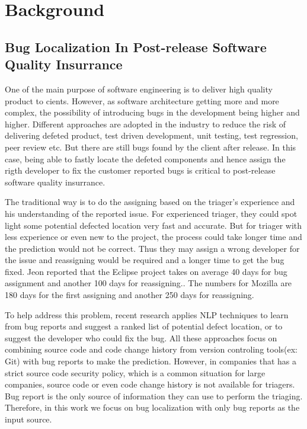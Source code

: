 \section{Background}
\subsection{Bug Localization In Post-release Software Quality Insurrance}
One of the main purpose of software engineering is to deliver high quality product to cients.
However, as software architecture getting more and more complex, the possibility of introducing bugs in the development being higher and higher.  
Different approaches are adopted in the industry to reduce the risk of delivering defeted product, test driven development, unit testing, test regression, peer review etc.
But there are still bugs found by the client after release. 
In this case, being able to fastly locate the defeted components and hence assign the rigth developer to fix the customer reported bugs is critical to post-release software quality insurrance. 

The traditional way is to do the assigning based on the triager's experience and his understanding of the reported issue. 
For experienced triager, they could spot light some potential defected location very fast and accurate.
But for triager with less experience or even new to the project, the process could take longer time and the prediction would not be correct.
Thus they may assign a wrong developer for the issue and reassigning would be required and a longer time to get the bug fixed. 
Jeon \etal \cite{jeong2009improving} reported that the Eclipse project takes on average 40 days for bug assignment and another 100 days for reassigning..
The numbers for Mozilla are 180 days for the first assigning and another 250 days for reassigning.

To help address this problem, recent research applies NLP techniques to learn from bug reports and suggest a ranked list of potential defect location\cite{gay2009use}\cite{lam2017bug}\cite{nguyen2011topic}\cite{zhou2012should}\cite{saha2013improving}\cite{shokripour2013so}, or to suggest the developer who could fix the bug\cite{anvik2011reducing}\cite{bhattacharya2010fine}\cite{xuan2012developer}\cite{jonsson2016automated}.
All these approaches focus on combining source code and code change history from version controling tools(ex: Git)  with bug reports to make the prediction.
However, in companies that has a strict source code security policy, which is a common situation for large companies, source code or even code change history is not available for triagers. 
Bug report is the only source of information they can use to perform the triaging.   
Therefore, in this work we focus on bug localization with only bug reports as the input source.


